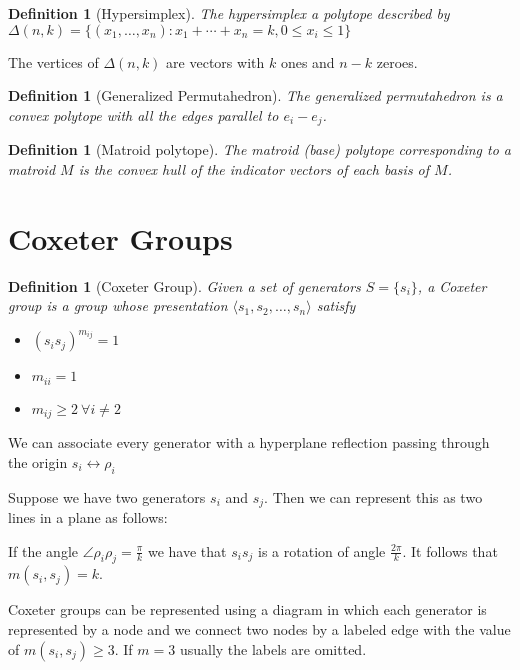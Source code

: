 \documentclass[leqno]{article}
\numberwithin{equation}{section}
\numberwithin{theorem}{section}
\newtheorem{definition}[theorem]{Definition}
\begin{document}
\begin{definition}[Hypersimplex] 
The hypersimplex a polytope described by $\Delta(n, k)=\{(x_1, \ldots, x_n): x_1 + \cdots+ x_n = k, 0\le x_i\le 1\}$
\end{definition}

The vertices of $\Delta(n,k)$ are vectors with $k$ ones and  $n-k$ zeroes.

\begin{definition}[Generalized Permutahedron] The generalized permutahedron is a convex polytope with all the edges parallel to $e_i-e_j$.
\end{definition}

 \begin{definition}[Matroid polytope] 
   The matroid (base) polytope corresponding to a matroid $M$ is the convex hull of the indicator vectors of each basis of  $M$.
\end{definition}


\section{Coxeter Groups}
\begin{definition}[Coxeter Group]
    Given a set of generators $S = \{s_i\}$, a Coxeter group is a group whose presentation $\langle s_1, s_2, \ldots, s_n  \rangle $ satisfy
\begin{itemize}[topsep=-6pt, itemsep=0pt]
  \item $(s_is_j)^{m_{ij}} = 1$
  \item $m_{ii} = 1$
  \item $m_{ij}\ge 2 \ \forall i\neq 2$
\end{itemize}
\end{definition}

We can associate every generator with a hyperplane reflection passing through the origin $s_i \leftrightarrow \rho_i$

Suppose we have two generators $s_i$ and  $s_j$. Then we can represent this as two lines in a plane as follows:

If the angle $\angle \rho_i \rho _j = \frac{\pi}{k}$ we have that $s_is_j$ is a rotation of angle $\frac{2\pi}{k}$. It follows that $m(s_i, s_j)=k$.

Coxeter groups can be represented using a diagram in which each generator is represented by a node and we connect two nodes by a labeled edge with the value of $m(s_i, s_j)\ge 3$. If $m=3$ usually the labels are omitted.
\end{document}
